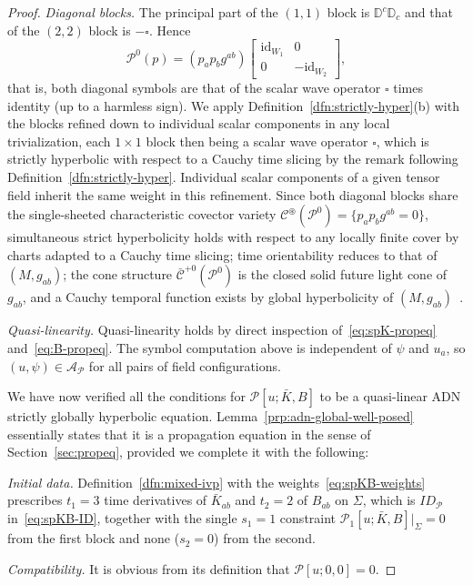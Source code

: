 \documentclass[a4paper]{article}
\theoremstyle{remark}
\newcommand{\id}{\mathrm{id}}
\newcommand{\oast}{\circledast} %
\newcommand{\D}{\mathbb{D}}
\begin{document}
\begin{proof}
\emph{Diagonal blocks.} The principal part of the $(1,1)$ block is
$\D^c\D_c$ and that of the $(2,2)$ block is $-\square$. Hence
\begin{equation}
	\mathcal{P}^0(p) = (p_a p_b g^{ab})
		\begin{bmatrix} \id_{W_1} & 0 \\ 0 & -\id_{W_2} \end{bmatrix} ,
\end{equation}
that is, both diagonal symbols are that of the scalar wave operator
$\square$ times identity (up to a harmless sign). We apply
Definition~\ref{dfn:strictly-hyper}(b) with the blocks refined down to
individual scalar components in any local trivialization, each
$1\times 1$ block then being a scalar wave operator $\square$, which
is strictly hyperbolic with respect to a Cauchy time slicing by the
remark following Definition~\ref{dfn:strictly-hyper}. Individual
scalar components of a given tensor field inherit the same weight in
this refinement. Since both diagonal blocks share the single-sheeted
characteristic covector variety $\mathcal{C}^\oast(\mathcal{P}^0) = \{ p_a p_b
g^{ab} = 0 \}$, simultaneous strict hyperbolicity holds with respect
to any locally finite cover by charts adapted to a Cauchy time
slicing; time orientability reduces to that of $(M,g_{ab})$; the cone
structure $\bar{\mathcal{C}}^{+0}(\mathcal{P}^0)$ is the closed solid future
light cone of $g_{ab}$, and a Cauchy temporal function exists by
global hyperbolicity of $(M,g_{ab})$~\cite[Thm.2.45]{minguzzi}.

\emph{Quasi-linearity.} Quasi-linearity holds by direct inspection
of~\eqref{eq:spK-propeq} and~\eqref{eq:B-propeq}. The symbol
computation above is independent of $\psi$ and $u_a$, so $(u, \psi)
\in \mathcal{A}_\mathcal{P}$ for all pairs of field configurations.

\noindent We have now verified all the conditions for $\mathcal{P}[u;
\bar{K}, B]$ to be a quasi-linear ADN strictly globally hyperbolic
equation. Lemma~\ref{prp:adn-global-well-posed} essentially states that
it is a propagation equation in the sense of Section~\ref{sec:propeq},
provided we complete it with the following:

\emph{Initial data.} Definition~\ref{dfn:mixed-ivp} with the
weights~\eqref{eq:spKB-weights} prescribes $t_1 = 3$ time derivatives of
$\bar{K}_{ab}$ and $t_2 = 2$ of $B_{ab}$ on $\Sigma$, which is
$ID_\mathcal{P}$ in~\eqref{eq:spKB-ID}, together with the single $s_1 =
1$ constraint $\mathcal{P}_1[u;\bar{K},B]|_\Sigma = 0$ from the first
block and none ($s_2 = 0$) from the second.

\emph{Compatibility.} It is obvious from its definition that
$\mathcal{P}[u;0, 0] = 0$.
\end{proof}
\end{document}
